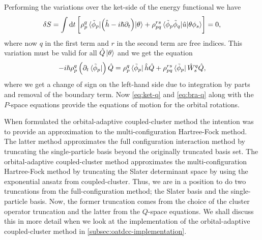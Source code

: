             Performing the variations over the ket-side of the energy functional
            we have
            \begin{align}
                \delta S
                = \int \dd t
                \left[ 
                    \rho^{q}_{p}
                    \mel*{\tilde{\phi}_p}{
                        \left( 
                            \hat{h}
                            - i\hslash \partial_t
                         \right)
                    }{\theta}
                    + \rho^{rs}_{pq}
                    \mel*{\tilde{\phi}_p\tilde{\phi}_q}{
                        \hat{u}
                    }{\theta\phi_s}
                 \right]
                = 0,
            \end{align}
            where now $q$ in the first term and $r$ in the second term are free
            indices.
            This variation must be valid for all $\hat{Q}\ket*{\theta}$ and we
            get the equation
            \begin{align}
                -i\hslash\rho^{q}_{p}\left( 
                    \partial_t \bra*{\tilde{\phi}_p}
                 \right)\hat{Q}
                =
                \rho^{q}_{p}\bra*{\tilde{\phi}_p}
                \hat{h}\hat{Q}
                + \rho^{rs}_{pq}
                \bra*{\tilde{\phi}_p}
                \hat{W}^{q}_{s}\hat{Q},
                \label{eq:bra-q}
            \end{align}
            where we get a change of sign on the left-hand side due to
            integration by parts and removal of the boundary term.
            Now \autoref{eq:ket-q} and \autoref{eq:bra-q} along with the
            $P$-space equations provide the equations of motion for the orbital
            rotations.

            When \citeauthor{kvaal2012ab} \cite{kvaal2012ab} formulated the
            orbital-adaptive coupled-cluster method the intention was to provide
            an approximation to the multi-configuration Hartree-Fock method.
            The latter method approximates the full configuration interaction
            method by truncating the single-particle basis beyond the originally
            truncated basis set.
            The orbital-adaptive coupled-cluster method approximates the
            multi-configuration Hartree-Fock method by truncating the Slater
            determinant space by using the exponential ansatz from
            coupled-cluster.
            Thus, we are in a position to do two truncations from the
            full-configuration method; the Slater basis and the single-particle
            basis.
            Now, the former truncation comes from the choice of the cluster
            operator truncation and the latter from the $Q$-space equations.
            We shall discuss this in more detail when we look at the
            implementation of the orbital-adaptive coupled-cluster method in
            \autoref{subsec:oatdcc-implementation}.



